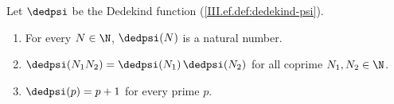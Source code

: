 Let $\dedpsi$ be the Dedekind function (\cref{III.ef.def:dedekind-psi}).
\begin{enumerate}[label=(\alph*)]
\item For every $N\in\N$, $\dedpsi(N)$ is a natural number.
\item $\dedpsi(N_1N_2)=\dedpsi(N_1)\,\dedpsi(N_2)$ for all coprime $N_1,N_2\in\N$.
\item $\dedpsi(p)=p+1$ for every prime $p$.
\end{enumerate}
